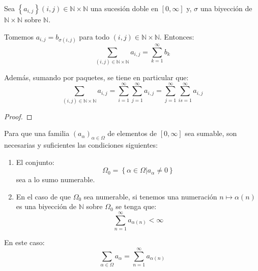 \documentclass[12pt]{report}
\theoremstyle{largebreak}
\begin{document}
    \begin{cor}
        Sea $\left\{a_{i,j} \right\}{(i,j)\in\mathbb{N}\times\mathbb{N}}$ una sucesión doble en $[0,\infty]$ y, $\sigma$ una biyección de $\mathbb{N}\times\mathbb{N}$ sobre $\mathbb{N}$.

        Tomemos $a_{i,j }=b_{\sigma(i,j)}$ para todo $(i,j)\in\mathbb{N}\times\mathbb{N}$. Entonces:
        \begin{equation*}
            \sum_{(i,j)\in\mathbb{N}\times\mathbb{N}}a_{i,j }=\sum_{k=1 }^{\infty}b_k
        \end{equation*}

        Además, sumando por paquetes, se tiene en particular que:
        \begin{equation*}
            \sum_{(i,j)\in\mathbb{N}\times\mathbb{N}}a_{i,j }=\sum_{i=1 }^{\infty} \sum_{j=1 }^{\infty}a_{ i,j}=\sum_{j=1 }^{\infty} \sum_{is=1 }^{\infty}a_{ i,j}
        \end{equation*}
    \end{cor}

    \begin{proof}
        
    \end{proof}

    \begin{theor}
        Para que una familia $\left(a_\alpha \right)_{\alpha\in\Omega }$ de elementos de $[0,\infty]$ sea sumable, son necesarias y suficientes las condiciones siguientes:
        \begin{enumerate}
            \item El conjunto:
            \begin{equation*}
                \Omega_0=\left\{\alpha\in\Omega\Big|a_\alpha\neq0 \right\}
            \end{equation*}
            sea a lo sumo numerable.
            \item En el caso de que $\Omega_0$ sea numerable, si tenemos una numeración $n\mapsto\alpha(n)$ es una biyección de $\mathbb{N}$ sobre $\Omega_0$ se tenga que:
            \begin{equation*}
                \sum_{n=1 }^{\infty}a_{\alpha(n)}<\infty
            \end{equation*}
        \end{enumerate}
        En este caso:
        \begin{equation*}
            \sum_{\alpha\in\Omega }a_\alpha=\sum_{n=1 }^{\infty}a_{\alpha(n)}
        \end{equation*}

    \end{theor}
    
\end{document}
